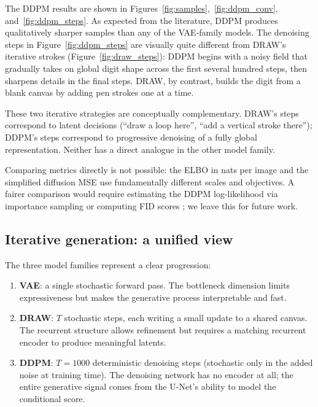 \documentclass{article}
\begin{document}
The DDPM results are shown in Figures~\ref{fig:samples},~\ref{fig:ddpm_conv},
and~\ref{fig:ddpm_steps}.
As expected from the literature, DDPM produces qualitatively sharper samples
than any of the VAE-family models. The denoising steps in
Figure~\ref{fig:ddpm_steps} are visually quite different from DRAW's iterative
strokes (Figure~\ref{fig:draw_steps}): DDPM begins with a noisy field that
gradually takes on global digit shape across the first several hundred steps,
then sharpens details in the final steps. DRAW, by contrast, builds the digit
from a blank canvas by adding pen strokes one at a time.

These two iterative strategies are conceptually complementary. DRAW's steps
correspond to latent decisions (``draw a loop here'', ``add a vertical stroke
there''); DDPM's steps correspond to progressive denoising of a fully global
representation. Neither has a direct analogue in the other model family.

Comparing metrics directly is not possible: the ELBO in nats per image and the
simplified diffusion MSE use fundamentally different scales and objectives.
A fairer comparison would require estimating the DDPM log-likelihood via
importance sampling \citep{ho2020ddpm} or computing FID scores
\citep{nichol2021improved}; we leave this for future work.

\subsection{Iterative generation: a unified view}

The three model families represent a clear progression:

\begin{enumerate}
  \item \textbf{VAE}: a single stochastic forward pass. The bottleneck
    dimension limits expressiveness but makes the generative process
    interpretable and fast.
  \item \textbf{DRAW}: \(T\) stochastic steps, each writing a small update to
    a shared canvas. The recurrent structure allows refinement but requires a
    matching recurrent encoder to produce meaningful latents.
  \item \textbf{DDPM}: \(T=1000\) deterministic denoising steps (stochastic
    only in the added noise at training time). The denoising network has no
    encoder at all; the entire generative signal comes from the U-Net's ability
    to model the conditional score.
\end{enumerate}
\end{document}
